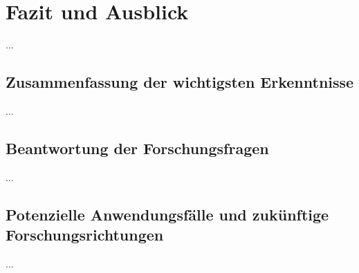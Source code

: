 \chapter{Fazit und Ausblick}

...

\section{Zusammenfassung der wichtigsten Erkenntnisse}

...

\section{Beantwortung der Forschungsfragen}

...

\section{Potenzielle Anwendungsfälle und zukünftige Forschungsrichtungen}

...